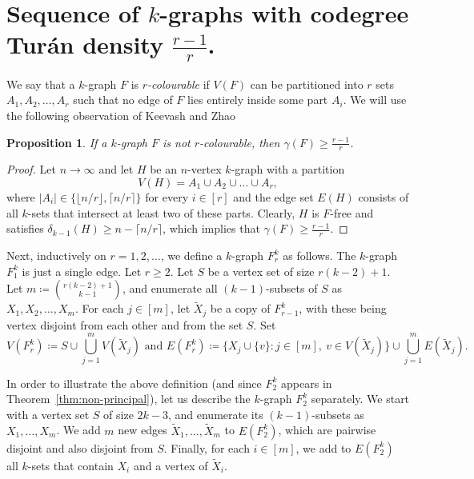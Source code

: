 \documentclass[11pt,a4paper]{article}
\newtheorem{proposition}[definition]{Proposition}
\theoremstyle{remark}
\newcommand{\hide}[1]{}
\begin{document}
\section{Sequence of $k$-graphs with codegree Tur\'an density $\frac{r-1}{r}$.
}\label{sec:single k-graph}

We say that a $k$-graph $F$ is \emph{$r$-colourable}
if $V(F)$ can be partitioned into $r$ sets $A_1,A_2,\dots,A_r$ such that no edge of $F$ lies entirely inside some part $A_i$. We will use the following observation of Keevash and Zhao~\cite{KZ07}


\begin{proposition}\label{ob:KZ} If a $k$-graph $F$ is not $r$-colourable, then $\gamma(F)\ge \frac{r-1}{r}$.
\end{proposition}

\begin{proof} Let $n\to\infty$ and let $H$ be an $n$-vertex $k$-graph with a partition
\[
V(H)=A_1\cup A_2\cup \dots \cup A_r,
\]
where $|A_i|\in\{\lfloor n/r\rfloor,\lceil n/r\rceil\}$ for every $i\in[r]$ 
and the edge set $E(H)$ consists of all $k$-sets that intersect at least two of these parts.
Clearly, $H$ is $F$-free and satisfies $\delta_{k-1}(H) \ge n-\lceil n/r\rceil$,
which implies that $\gamma(F)\ge \frac{r-1}{r}$.\end{proof}


Next, inductively on $r=1,2,\dots$, we define a $k$-graph $F^k_r$ as follows. The $k$-graph $F^k_1$ is just a single edge. Let $r\ge 2$.
Let $S$ be a vertex set of size $r(k-2)+1$. Let $m\coloneqq \binom{r(k-2)+1}{k-1}$, and enumerate all $(k-1)$-subsets of $S$ as $X_1,X_2,\dots ,X_m$. For each $j\in [m]$, let $\tilde{X}_j$ be a copy of $F^{k}_{r-1}$, with these being vertex disjoint from each other and from the set $S$.
Set 
\[V(F^k_r) \coloneqq S\cup \bigcup^m_{j=1}V\left(\tilde{X}_j\right) \text{ and } E(F^k_r) \coloneqq \Big\{X_j \cup \{v\}: j\in[m],\ v\in V(\tilde{X}_j)\Big\}\cup \bigcup^m_{j=1}E\left(\tilde{X}_j\right) .\]


In order to illustrate the above definition (and since $F_2^k$ appears in Theorem~\ref{thm:non-principal}), let us describe the $k$-graph $F^k_2$ separately.
We start with a vertex set $S$ of size $2k-3$, and enumerate its $(k-1)$-subsets as $X_1,\dots ,X_m$. We add $m$ new edges $\tilde{X}_{1},\dots,\tilde{X}_m$ to $E(F_2^k)$, which are pairwise disjoint and also disjoint from $S$. Finally, for each $i\in [m]$, we add  to $E(F_2^k)$ all $k$-sets that contain $X_i$ and a vertex of $\tilde{X}_{i}$. 
\hide{Thus
\[
V(F^k_2)\coloneqq S\cup \bigcup_{i\in [m]}\tilde{X}_{i}\quad\text{and}\quad
E(F^k_2)\coloneqq \left\{X_i\cup \{v\}:i\in[m],v \in \tilde{X}_{i}\right\}\cup \left\{\tilde{X}_{i}:i\in [m]\right\}.
\]
}
\end{document}
